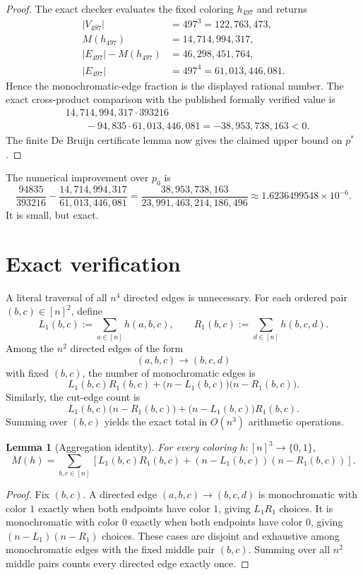 \documentclass[11pt]{article}
\newtheorem{lemma}[theorem]{Lemma}
\newcommand{\1}{\mathbf{1}}
\begin{document}
\begin{proof}
The exact checker evaluates the fixed coloring $h_{497}$ and returns
\[
\begin{aligned}
  |V_{497}|&=497^3=122{,}763{,}473,\\
  M(h_{497})&=14{,}714{,}994{,}317,\\
  |E_{497}|-M(h_{497})&=46{,}298{,}451{,}764,\\
  |E_{497}|&=497^4=61{,}013{,}446{,}081.
\end{aligned}
\]
Hence the monochromatic-edge fraction is the displayed rational number.
The exact cross-product comparison with the published formally verified
value is
\[
\begin{aligned}
&14{,}714{,}994{,}317\cdot393216\\
&\qquad
-94{,}835\cdot61{,}013{,}446{,}081
=-38{,}953{,}738{,}163<0.
\end{aligned}
\]
The finite De Bruijn certificate lemma now gives the claimed upper bound on
$p^*$.
\end{proof}

The numerical improvement over $p_0$ is
\[
  \frac{94835}{393216}
  -\frac{14{,}714{,}994{,}317}{61{,}013{,}446{,}081}
  =\frac{38{,}953{,}738{,}163}
  {23{,}991{,}463{,}214{,}186{,}496}
  \approx1.6236499548\times10^{-6}.
\]
It is small, but exact.

\section{Exact verification}
\label{sec:verification}

A literal traversal of all $n^4$ directed edges is unnecessary.  For each
ordered pair $(b,c)\in[n]^2$, define
\[
  L_1(b,c):=\sum_{a\in[n]} h(a,b,c),
  \qquad
  R_1(b,c):=\sum_{d\in[n]} h(b,c,d).
\]
Among the $n^2$ directed edges of the form
\[
  (a,b,c)\to(b,c,d)
\]
with fixed $(b,c)$, the number of monochromatic edges is
\[
  L_1(b,c)R_1(b,c)
  +\bigl(n-L_1(b,c)\bigr)\bigl(n-R_1(b,c)\bigr).
\]
Similarly, the cut-edge count is
\[
  L_1(b,c)\bigl(n-R_1(b,c)\bigr)
  +\bigl(n-L_1(b,c)\bigr)R_1(b,c).
\]
Summing over $(b,c)$ yields the exact total in $O(n^3)$ arithmetic
operations.

\begin{lemma}[Aggregation identity]
For every coloring $h:[n]^3\to\{0,1\}$,
\[
  M(h)=
  \sum_{b,c\in[n]}
  \left[
    L_1(b,c)R_1(b,c)
    +(n-L_1(b,c))(n-R_1(b,c))
  \right].
\]
\end{lemma}

\begin{proof}
Fix $(b,c)$.  A directed edge $(a,b,c)\to(b,c,d)$ is monochromatic with
color $1$ exactly when both endpoints have color $1$, giving
$L_1R_1$ choices.  It is monochromatic with color $0$ exactly when both
endpoints have color $0$, giving $(n-L_1)(n-R_1)$ choices.  These cases are
disjoint and exhaustive among monochromatic edges with the fixed middle pair
$(b,c)$.  Summing over all $n^2$ middle pairs counts every directed edge
exactly once.
\end{proof}
\end{document}
